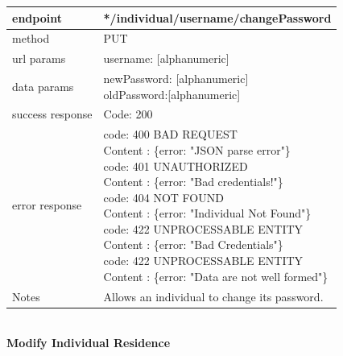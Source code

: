 \begin{legal}
\begin{legal}
\begin{itemize}
							\begin{tabularx}{\linewidth}{| l| l }
								\hline
								endpoint & */individual/{username}/changePassword \\
								\hline
								method & PUT \\
								\hline
								url params & 
								\parbox{0.7\textwidth}{
									\bigskip
									username: [alphanumeric]
									\bigskip
								}\\
								\hline
								data params & 
								\parbox{0.7\textwidth}{
									\bigskip
									newPassword: [alphanumeric]\\
									oldPassword:[alphanumeric]
									\bigskip
								} \\
								\hline
								success response &
								\parbox{0.7\textwidth}{
									\bigskip
									Code: 200
									\bigskip
								} \\
								\hline
								error response &
								\parbox{0.7\textwidth}{
									\bigskip
									code: 400 BAD REQUEST \\
									Content : \{error: "JSON parse error"\}\\
									code: 401 UNAUTHORIZED \\
									Content : \{error: "Bad credentials!"\}\\
									code: 404 NOT FOUND \\
									Content : \{error: "Individual Not Found"\}\\
									code: 422 UNPROCESSABLE ENTITY\\
									Content : \{error: "Bad Credentials"\}\\
									code: 422 UNPROCESSABLE ENTITY\\
									Content : \{error: "Data are not well formed"\}
									\bigskip
								} \\
								\hline
								Notes & \parbox{0.7\textwidth}{
									\bigskip
									Allows an individual to change its password.
									\bigskip
								} \\
								\hline
							\end{tabularx}\\
							
							\textbf{Modify Individual Residence}\\
				

\end{itemize}
\end{legal}
\end{legal}
